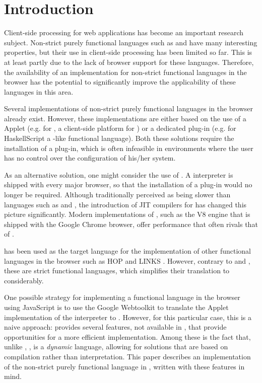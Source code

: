 \section{Introduction}\label{sapljs:sec:intro}
Client-side processing for web applications has become an important research
subject. Non-strict purely functional languages such as \Haskell and \Clean have
many interesting properties, but their use in client-side processing has been
limited so far. This is at least partly due to the lack of browser support for
these languages. Therefore, the availability of  an implementation for
non-strict functional languages in the browser has the potential to
significantly improve the applicability of these languages in this area.

Several implementations of non-strict purely functional languages in the browser
already exist. However, these implementations are either based on the use of a
\Java Applet (e.g. for \Sapl, a client-side platform for \Clean
\cite{JKP, PJKA}) or a dedicated plug-in (e.g. for \textsf{HaskellScript} 
\cite{HaskellScript} a \Haskell-like functional language). Both these solutions
require the installation of a plug-in, which is often infeasible in environments
where the user has no control over the configuration of his/her system.

As an alternative solution, one might consider the use of \JavaScript. A
\JavaScript interpreter is shipped with every major browser, so that the
installation of a plug-in would no longer be required.  Although traditionally
perceived as being slower than languages such as \Java and \C, the introduction 
of JIT compilers for \JavaScript has changed this picture significantly. Modern
implementations of \JavaScript, such as the V8 engine that is shipped with the
Google Chrome browser, offer performance that often rivals that of \Java.

\JavaScript has been used as the target language for the implementation of
other functional languages in the browser such as HOP and LINKS
\cite{HOP1, HOP2, LINKS1}. However, contrary to \Haskell and \Clean, these are
strict functional languages, which simplifies their translation to \JavaScript
considerably.

One possible strategy for implementing a functional language in the browser
using JavaScript is to use the Google Webtoolkit to translate the \Java Applet
implementation of the \Sapl interpreter to \JavaScript. However, for this
particular case, this is a naive approach: \JavaScript provides several
features, not available in \Java, that provide opportunities for a more
efficient implementation. Among these is the fact that, unlike \Java,
\JavaScript, is a {\em dynamic} language, allowing for solutions that are based
on compilation rather than interpretation. This paper describes an
implementation of the non-strict purely functional language \Sapl in
\JavaScript, written with these features in mind.

